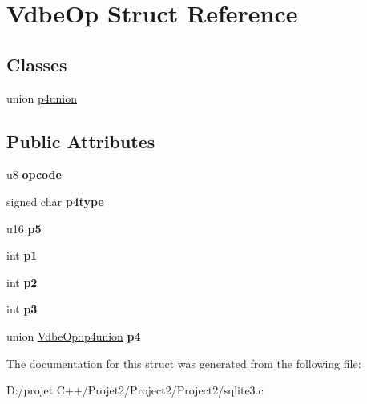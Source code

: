\hypertarget{struct_vdbe_op}{}\section{Vdbe\+Op Struct Reference}
\label{struct_vdbe_op}
\subsection*{Classes}
\begin{DoxyCompactItemize}
\item 
union \mbox{\hyperlink{union_vdbe_op_1_1p4union}{p4union}}
\end{DoxyCompactItemize}
\subsection*{Public Attributes}
\begin{DoxyCompactItemize}
\item 
\mbox{\label{struct_vdbe_op_ae12a8e7a8f5f7ba39fa379c9ad287837}} 
u8 {\bfseries opcode}
\item 
\mbox{\label{struct_vdbe_op_a124dee58d3e0d73c7dfaf811a3311023}} 
signed char {\bfseries p4type}
\item 
\mbox{\label{struct_vdbe_op_a6262866780a8408c5f85b93117064fe3}} 
u16 {\bfseries p5}
\item 
\mbox{\label{struct_vdbe_op_a17c8326a1e3ac5612d4aaaa88f383b3b}} 
int {\bfseries p1}
\item 
\mbox{\label{struct_vdbe_op_aba021fa9d30343c16794d9b76d8bffcd}} 
int {\bfseries p2}
\item 
\mbox{\label{struct_vdbe_op_ad7ef3319da20d5423b8cc5da6995d193}} 
int {\bfseries p3}
\item 
\mbox{\label{struct_vdbe_op_a985bba6c3cd8e093d029e4462f8b4a59}} 
union \mbox{\hyperlink{union_vdbe_op_1_1p4union}{Vdbe\+Op\+::p4union}} {\bfseries p4}
\end{DoxyCompactItemize}


The documentation for this struct was generated from the following file\+:\begin{DoxyCompactItemize}
\item 
D\+:/projet C++/\+Projet2/\+Project2/\+Project2/sqlite3.\+c\end{DoxyCompactItemize}
